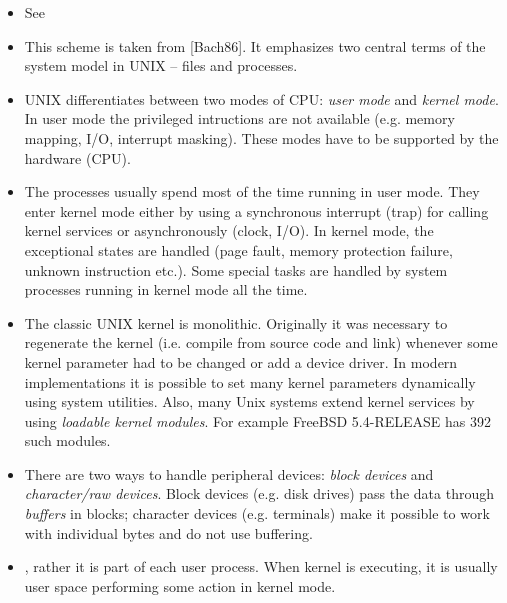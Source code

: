 \begin{itemize}
\item See 
\end{itemize}


\begin{slide}

\end{slide}

\begin{itemize}
\item This scheme is taken from [Bach86]. It emphasizes two central terms
of the system model in UNIX -- files and processes.
\item UNIX differentiates between two modes of CPU: \emph{user mode} and
\emph{kernel mode}. In user mode the privileged intructions are not
available (e.g. memory mapping, I/O, interrupt masking). These modes have to
be supported by the hardware (CPU).
\item The processes usually spend most of the time running in user mode.
They enter kernel mode either by using a synchronous interrupt (trap) for
calling kernel services or asynchronously (clock, I/O). In kernel mode,
the exceptional states are handled (page fault, memory protection failure,
unknown instruction etc.). Some special tasks are handled by system processes
running in kernel mode all the time.
\item The classic UNIX kernel is monolithic. Originally it was necessary to
regenerate the kernel (i.e. compile from source code and link) whenever some
kernel parameter had to be changed or add a device driver. In modern
implementations it is possible to set many kernel parameters dynamically using
system utilities. Also, many Unix systems extend kernel services by using
\emph{loadable kernel modules}. For example FreeBSD 5.4-RELEASE has 392 such
modules.
\item There are two ways to handle peripheral devices:
\emph{block devices} and \emph{character/raw devices}. Block devices (e.g.
disk drives) pass the data through \emph{buffers} in blocks; character devices
(e.g. terminals) make it possible to work with individual bytes and do not use
buffering.
\item {}, rather it is part of each
user process. When kernel is executing, it is usually user space performing some
action in kernel mode.
\end{itemize}


